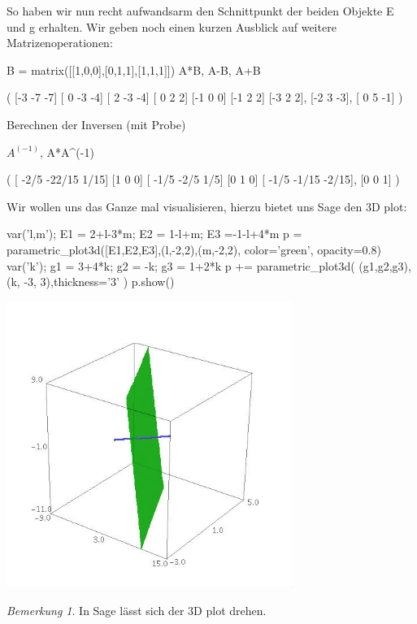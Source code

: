 \documentclass[fontsize=12pt,paper=a4,twoside,bibtotoc,idxtotoc,
liststotoc,pagesize,BCOR1.2cm,DIV15,chapterprefix,pagesize=pdftex]{scrbook}
\theoremstyle{plain}
\theoremstyle{definition}
\theoremstyle{remark}
\newtheorem{bem}[equation]{Bemerkung}
\begin{document}
So haben wir nun recht aufwandsarm den Schnittpunkt der beiden Objekte E und g erhalten. Wir geben noch einen kurzen Ausblick auf weitere 
Matrizenoperationen:
\begin{sagein}
B = matrix([[1,0,0],[0,1,1],[1,1,1]])
A*B, A-B, A+B
\end{sagein}
\begin{sage}
(
[-3 -7 -7]   [ 0 -3 -4]  [ 2 -3 -4]
[ 0  2  2]   [-1  0  0]  [-1  2  2]
[-3  2  2],  [-2  3 -3], [ 0  5 -1]
)
\end{sage}
Berechnen der Inversen (mit Probe)
\begin{sagein}
$A^{(-1)}$, A*A^(-1)
\end{sagein}
\begin{sage}
(
[  -2/5 -22/15   1/15]  [1 0 0]
[  -1/5   -2/5    1/5]  [0 1 0]
[  -1/5  -1/15  -2/15], [0 0 1]
)
\end{sage}
Wir wollen uns das Ganze mal visualisieren, hierzu bietet uns Sage den 3D plot:
\begin{sagein}
var('l,m'); E1 = 2+l-3*m; E2 = 1-l+m; E3 =-1-l+4*m
p = parametric_plot3d([E1,E2,E3],(l,-2,2),(m,-2,2), color='green', opacity=0.8)
var('k'); g1 = 3+4*k; g2 = -k; g3 = 1+2*k
p += parametric_plot3d( (g1,g2,g3), (k, -3, 3),thickness='3' ) 
p.show()
\end{sagein}
\begin{center}
\includegraphics[width=0.7\textwidth]{ebene2}
\end{center}
\begin{bem} In Sage lässt sich der 3D plot drehen.\end{bem}

\end{document}
